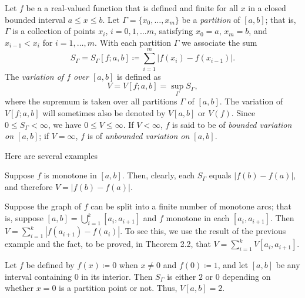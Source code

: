 Let $f$ be a a real-valued function that is defined and finite for all $x$
in a closed bounded interval $a\leq x\leq b$. Let
$\Gamma=\{x_0,\dotsc,x_m\}$ be a \emph{partition} of $[a,b]$; that is,
$\Gamma$ is a collection of points $x_i$, $i=0,1,\dots m$, satisfying
$x_0=a$, $x_m=b$, and $x_{i-1}<x_i$ for $i=1,\dotsc,m$. With each partition
$\Gamma$ we associate the sum
\begin{equation}
\label{eq:variation-sums}
S_\Gamma=S_\Gamma[f;a,b]\coloneqq\sum_{i=1}^m|f(x_i)-f(x_{i-1})|.
\end{equation}
The \emph{variation of $f$ over $[a,b]$} is defined as
\begin{equation}
\label{eq:variation}
V=V[f;a,b]=\sup_\Gamma S_\Gamma,
\end{equation}
where the supremum is taken over all partitions $\Gamma$ of $[a,b]$. The
variation of $V[f;a,b]$ will sometimes also be denoted by $V[a,b]$ or
$V(f)$. Since $0\leq S_\Gamma<\infty$, we have $0\leq V\leq\infty$. If
$V<\infty$, $f$ is said to be of \emph{bounded variation on $[a,b]$}; if
$V=\infty$, $f$ is of \emph{unbounded variation on $[a,b]$}.

Here are several examples
\begin{example}
Suppose $f$ is monotone in $[a,b]$. Then, clearly, each $S_\Gamma$ equals
$|f(b)-f(a)|$, and therefore $V=|f(b)-f(a)|$.
\end{example}
\begin{example}
Suppose the graph of $f$ can be split into a finite number of monotone
arcs; that is, suppose $[a,b]=\bigcup_{i=1}^k[a_i,a_{i+1}]$ and $f$
monotone in each $[a_i,a_{i+1}]$. Then
$V=\sum_{i=1}^k|f(a_{i+1})-f(a_i)|$. To see this, we use the result of the
previous example and the fact, to be proved, in Theorem 2.2, that
$V=\sum_{i=1}^kV[a_i,a_{i+1}]$.
\end{example}
\begin{example}
Let $f$ be defined by $f(x)\coloneqq 0$ when $x\neq 0$ and $f(0)\coloneqq
1$, and let $[a,b]$ be any interval containing $0$ in its interior. Then
$S_\Gamma$ is either $2$ or $0$ depending on whether $x=0$ is a partition
point or not. Thus, $V[a,b]=2$.
\end{example}

